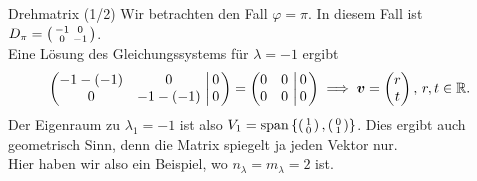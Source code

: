 \begin{Beispiel}{Drehmatrix (1/2)}
Wir betrachten den Fall $\varphi=\pi$. In diesem Fall ist $D_\pi=\left(\begin{smallmatrix}-1&0\\0&-1\end{smallmatrix}\right)$.\\
Eine Lösung des Gleichungssystems für $\lambda=-1$ ergibt
\begin{equation*}
    \left(\begin{matrix}-1-(-1)&0\\0&-1-(-1)\end{matrix}\,\left|\,\begin{matrix}0\\0\end{matrix}\right.\right)=\left(\begin{matrix}0&0\\0&0\end{matrix}\,\left|\,\begin{matrix}0\\0\end{matrix}\right.\right)\implies {\text{\boldmath${v}$}}=\begin{pmatrix}r\\t\end{pmatrix},\,r,t\in\mathbb{R}.
\end{equation*}
Der Eigenraum zu $\lambda_1=-1$ ist also $V_1=\text{span}\left\{\left(\begin{smallmatrix}1\\0\end{smallmatrix}\right),\left(\begin{smallmatrix}0\\1\end{smallmatrix}\right)\right\}$. Dies ergibt auch geometrisch Sinn, denn die Matrix spiegelt ja jeden Vektor nur.\\
Hier haben wir also ein Beispiel, wo $n_\lambda=m_\lambda=2$ ist.
\end{Beispiel}

